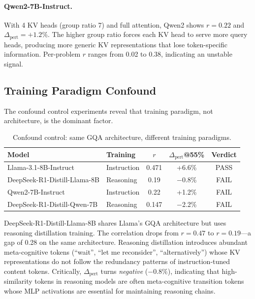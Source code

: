 \documentclass[11pt]{article}
\begin{document}
\paragraph{Qwen2-7B-Instruct.} With 4 KV heads (group ratio 7) and full attention, Qwen2 shows $r{=}0.22$ and $\Delta_\text{pert}{=}{+}1.2\%$. The higher group ratio forces each KV head to serve more query heads, producing more generic KV representations that lose token-specific information. Per-problem $r$ ranges from 0.02 to 0.38, indicating an unstable signal.

\subsection{Training Paradigm Confound}

The confound control experiments reveal that training paradigm, not architecture, is the dominant factor.

\begin{table}[h]
\centering
\caption{Confound control: same GQA architecture, different training paradigms.}
\label{tab:confound}
\small
\begin{tabular}{@{}llccc@{}}
\toprule
Model & Training & $r$ & $\Delta_\text{pert}$@55\% & Verdict \\
\midrule
Llama-3.1-8B-Instruct & Instruction & 0.471 & +6.6\% & PASS \\
DeepSeek-R1-Distill-Llama-8B & Reasoning & 0.19 & $-$0.8\% & FAIL \\
\midrule
Qwen2-7B-Instruct & Instruction & 0.22 & +1.2\% & FAIL \\
DeepSeek-R1-Distill-Qwen-7B & Reasoning & 0.147 & $-$2.2\% & FAIL \\
\bottomrule
\end{tabular}
\end{table}

DeepSeek-R1-Distill-Llama-8B shares Llama's GQA architecture but uses reasoning distillation training. The correlation drops from $r{=}0.47$ to $r{=}0.19$---a gap of 0.28 on the same architecture. Reasoning distillation introduces abundant meta-cognitive tokens (``wait'', ``let me reconsider'', ``alternatively'') whose KV representations do not follow the redundancy patterns of instruction-tuned content tokens. Critically, $\Delta_\text{pert}$ turns \emph{negative} ($-0.8\%$), indicating that high-similarity tokens in reasoning models are often meta-cognitive transition tokens whose MLP activations are essential for maintaining reasoning chains.
\end{document}
